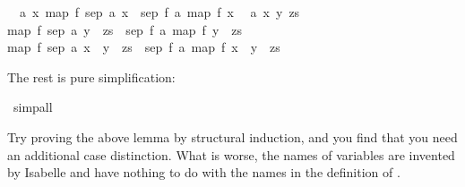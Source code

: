 \begin{isabellebody}
\begin{isamarkuptxt}
\begin{isabelle}
\ {}{\isachardot}\ {\isasymAnd}a\ x{\isachardot}\ map\ f\ {\isacharparenleft}sep\ {\isacharparenleft}a{\isacharcomma}\ {\isacharbrackleft}x{\isacharbrackright}{\isacharparenright}{\isacharparenright}\ {\isacharequal}\ sep\ {\isacharparenleft}f\ a{\isacharcomma}\ map\ f\ {\isacharbrackleft}x{\isacharbrackright}{\isacharparenright}\isanewline
\ {}{\isachardot}\ {\isasymAnd}a\ x\ y\ zs{\isachardot}\isanewline
{}map\ f\ {\isacharparenleft}sep\ {\isacharparenleft}a{\isacharcomma}\ y\ {\isacharhash}\ zs{\isacharparenright}{\isacharparenright}\ {\isacharequal}\ sep\ {\isacharparenleft}f\ a{\isacharcomma}\ map\ f\ {\isacharparenleft}y\ {\isacharhash}\ zs{\isacharparenright}{\isacharparenright}\ {\isasymLongrightarrow}\isanewline
{}map\ f\ {\isacharparenleft}sep\ {\isacharparenleft}a{\isacharcomma}\ x\ {\isacharhash}\ y\ {\isacharhash}\ zs{\isacharparenright}{\isacharparenright}\ {\isacharequal}\ sep\ {\isacharparenleft}f\ a{\isacharcomma}\ map\ f\ {\isacharparenleft}x\ {\isacharhash}\ y\ {\isacharhash}\ zs{\isacharparenright}{\isacharparenright}%
\end{isabelle}
The rest is pure simplification:%
\end{isamarkuptxt}%
\isamarkupfalse%
\ simp{\isacharunderscore}all\isanewline
\isamarkupfalse%
%
\endisatagproof
{\isafoldproof}%
%
\isadelimproof
%
\endisadelimproof
\isamarkuptrue%
%
\begin{isamarkuptext}%
Try proving the above lemma by structural induction, and you find that you
need an additional case distinction. What is worse, the names of variables
are invented by Isabelle and have nothing to do with the names in the
definition of .


\end{isamarkuptext}
\end{isabellebody}
